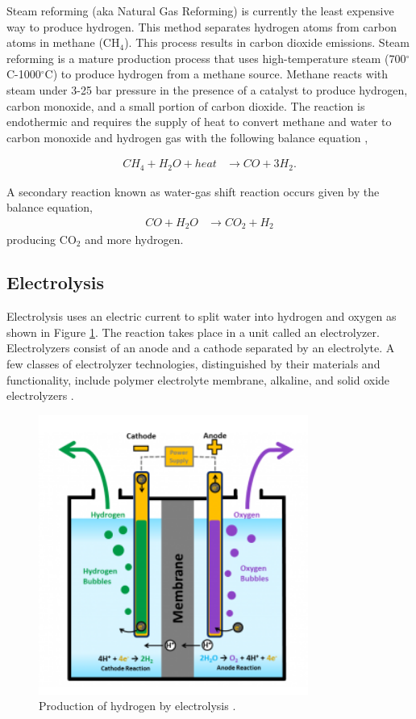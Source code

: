\documentclass{anstrans}
\begin{document}
Steam reforming (aka Natural Gas Reforming) is currently the least expensive way to produce hydrogen. This method separates hydrogen atoms from carbon atoms in methane (CH$_4$). This process results in carbon dioxide emissions.
Steam reforming is a mature production process that uses high-temperature steam (700$^{\circ}$C-1000$^{\circ}$C) to produce hydrogen from a methane source. Methane reacts with steam under 3-25 bar pressure in the presence of a catalyst to produce hydrogen, carbon monoxide, and a small portion of carbon dioxide. The reaction is endothermic and requires the supply of heat to convert methane and water to carbon monoxide and hydrogen gas with the following balance equation \cite{doe_office_of_energy_efficiency_and_renewable_energy_hydrogen_2020},

\begin{align}
CH_4 + H_2O + heat & \rightarrow CO + 3H_2 .
\label{eq:1}
\end{align}

A secondary reaction known as water-gas shift reaction occurs given by the balance equation,
\begin{align}
CO + H_2O & \rightarrow CO_2 + H_2
\label{eq:2}
\end{align}
producing CO$_2$ and more hydrogen.

\subsection{Electrolysis}

Electrolysis uses an electric current to split water into hydrogen and oxygen as shown in Figure \ref{fig:electro}. The reaction takes place in a unit called an electrolyzer. Electrolyzers consist of an anode and a cathode separated by an electrolyte. A few classes of electrolyzer technologies, distinguished by their materials and functionality, include polymer electrolyte membrane, alkaline, and solid oxide electrolyzers \cite{doe_office_of_energy_efficiency_and_renewable_energy_hydrogen_2020}.

\begin{figure}[H]
	\centering
	\includegraphics[width=0.55\linewidth]{figures/electrolysis.png}
	\hfill
	\caption{Production of hydrogen by electrolysis \cite{doe_office_of_energy_efficiency_and_renewable_energy_hydrogen_2020}.}
	\label{fig:electro}
\end{figure}
\end{document}
